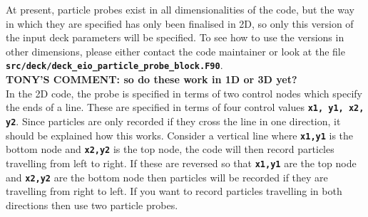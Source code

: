 \documentclass[12pt,a4paper]{article}
\newcommand{\inlinecode}[1]{{\color{warwickred} \bf\texttt{#1}}}
\newcommand{\tony}[1]{{\color{warwickred} \bf{TONY'S COMMENT:} \bf{#1}}\\}
\begin{document}
At present, particle probes exist in all dimensionalities of the code, but the
way in which they are specified has only been finalised in 2D, so only this
version of the input deck parameters will be specified. To see how to use the
versions in other dimensions, please either contact the code maintainer or
look at the file \inlinecode{src/deck/deck\_eio\_particle\_probe\_block.F90}.\\
\tony{so do these work in 1D or 3D yet?}

In the 2D code, the probe is specified in terms of two control nodes which
specify the ends of a line. These are specified in terms of four control
values \inlinecode{x1, y1, x2, y2}. Since particles are only recorded if they
cross the line in one direction, it should be explained how this
works. Consider a vertical line where \inlinecode{x1,y1} is the bottom node
and \inlinecode{x2,y2} is the top node, the code will then record particles
travelling from left to right. If these are reversed so that
\inlinecode{x1,y1} are the top node and \inlinecode{x2,y2} are the bottom node
then particles will be recorded if they are travelling from right to left. If
you want to record particles travelling in both directions then use two
particle probes.
\end{document}
